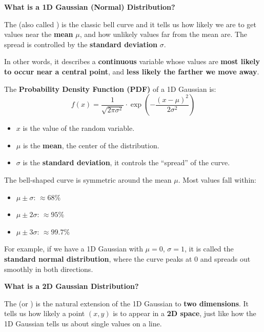\begin{remarkbox}
    \begin{flushleft}
        \textcolor{Green3}{ \textbf{What is a 1D Gaussian (Normal) Distribution?}}
    \end{flushleft}
    The  (also called ) is the classic bell curve and it tells us how likely we are to get values near the \textbf{mean} $\mu$, and how unlikely values far from the mean are. The spread is controlled by the \textbf{standard deviation} $\sigma$.

    \highspace
    In other words, it describes a \textbf{continuous} variable whose values are \textbf{most likely to occur near a central point}, and \textbf{less likely the farther we move away}.

    \highspace
    The \textbf{Probability Density Function (PDF)} of a 1D Gaussian is:
    \begin{equation}
        f(x) = \dfrac{1}{\sqrt{2\pi \sigma^2}} \cdot \exp\left(-\dfrac{(x - \mu)^2}{2\sigma^2}\right)
    \end{equation}
    \begin{itemize}
        \item $x$ is the value of the random variable.
        \item $\mu$ is the \textbf{mean}, the center of the distribution.
        \item $\sigma$ is the \textbf{standard deviation}, it controls the ``spread'' of the curve.
    \end{itemize}
    The bell-shaped curve is symmetric around the mean $\mu$. Most values fall within:
    \begin{itemize}
        \item $\mu \pm \sigma$:  $\approx 68 \%$
        \item $\mu \pm 2\sigma$: $\approx 95 \%$
        \item $\mu \pm 3\sigma$: $\approx 99.7 \%$
    \end{itemize}
    For example, if we have a 1D Gaussian with $\mu = 0$, $\sigma = 1$, it is called the \textbf{standard normal distribution}, where the curve peaks at 0 and spreads out smoothly in both directions.

    \highspace
    \begin{flushleft}
        \textcolor{Green3}{ \textbf{What is a 2D Gaussian Distribution?}}
    \end{flushleft}
    The  (or ) is the natural extension of the 1D Gaussian to \textbf{two dimensions}. It tells us how likely a point $(x, y)$ is to appear in a \textbf{2D space}, just like how the 1D Gaussian tells us about single values on a line.


\end{remarkbox}

